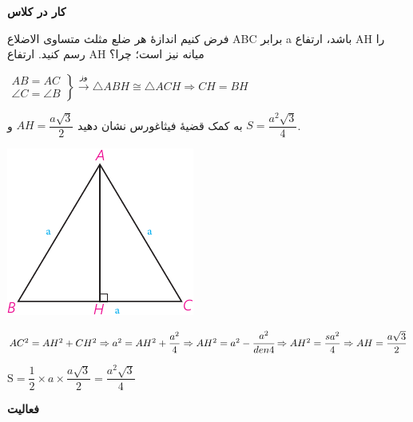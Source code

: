 \documentclass[12pt, a4paper]{book}
\begin{document}
\bigskip

\textbf{کار در کلاس}

\begin{minipage}{0.7\textwidth}
	فرض کنیم اندازهٔ هر ضلع مثلث متساوی الاضلاع ABC برابر a باشد، ارتفاع AH را رسم کنید. ارتفاع AH میانه نیز است؛ چرا؟
	\begin{flushleft}
		$
	\left.
	\begin{array}{ccc}
		AB = AC \\
		\angle C = \angle B
	\end{array}
	\right\}
	\xrightarrow{\mbox{وز}} \triangle ABH \cong \triangle ACH \Rightarrow CH = BH
	$
	\end{flushleft}
	به کمک قضیهٔ فیثاغورس نشان دهید 
	$AH = \dfrac{a\sqrt{3}}2$
	و 
	$S = \dfrac{a^2 \sqrt{3}}{4}$.
\end{minipage}
\begin{minipage}{0.25\textwidth}
	\begin{flushleft}
		\includegraphics{"Shapes/Fasl - 3/Dars 2/P65-S3"}
	\end{flushleft}
\end{minipage}

	\begin{flushleft}
	$
	AC^2 = AH^2 + CH^2 \Rightarrow a^2 = AH^2 + \dfrac{a^2}{4} \Rightarrow AH^2 = a^2 - \cfrac{a^2}{den4} \Rightarrow AH^2 = \dfrac{sa^2}{4} \Rightarrow AH = \dfrac{a\sqrt{3}}{2}
	$
	
	$
	\text{S} = \dfrac12 \times a \times \dfrac{a\sqrt{3}}{2} = \dfrac{a^2\sqrt{3}}{4}
	$
\end{flushleft}


\bigskip

\textbf{فعالیت}
\end{document}
